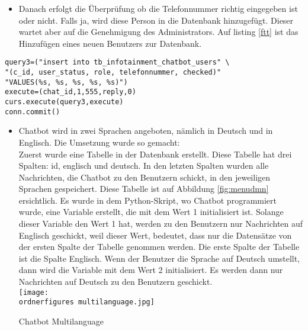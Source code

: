\label{fgeee}
\begin{itemize}
	\item Danach erfolgt die Überprüfung ob die Telefonnummer richtig eingegeben ist oder nicht. Falls ja, wird diese Person in die Datenbank hinzugefügt. Dieser wartet aber auf die Genehmigung des Administrators. Auf listing \ref{ftt} ist das Hinzufügen eines neuen Benutzers zur Datenbank.
\end{itemize}
\begin{lstlisting}[frame=single] 
query3=("insert into tb_infotainment_chatbot_users" \
"(c_id, user_status, role, telefonnummer, checked)"
"VALUES(%s, %s, %s, %s, %s)")
execute=(chat_id,1,555,reply,0)
curs.execute(query3,execute)
conn.commit()
\end{lstlisting}
\label{ftt}
\begin{itemize}
	\item Chatbot wird in zwei Sprachen angeboten, n\"amlich in Deutsch und in Englisch. Die Umsetzung wurde so gemacht: \\
		Zuerst wurde eine Tabelle in der Datenbank erstellt. Diese Tabelle hat drei Spalten: id, englisch und deutsch. In den letzten Spalten wurden alle Nachrichten, die Chatbot zu den Benutzern schickt, in den jeweiligen Sprachen gespeichert. Diese Tabelle ist auf Abbildung \ref{fig:menudmn} ersichtlich. 
		Es wurde in dem Python-Skript, wo Chatbot programmiert wurde, eine Variable erstellt, die mit dem Wert 1 initialisiert ist. Solange dieser Variable den Wert 1 hat, werden zu den Benutzern nur Nachrichten auf Englisch geschickt, weil dieser Wert, bedeutet, dass nur die Datens\"atze von der ersten Spalte der Tabelle genommen werden. Die erste Spalte der Tabelle ist die Spalte Englisch. Wenn der Benutzer die Sprache auf Deutsch umstellt, dann wird die Variable mit dem Wert 2 initialisiert. Es werden dann nur Nachrichten auf Deutsch zu den Benutzern geschickt. \\
		\captionsetup{type=figure}
		\texttt{[image: \\ordnerfigures multilanguage.jpg]}
		\caption{Chatbot Multilanguage} 
		\label{fig:menudmn}
\end{itemize}
